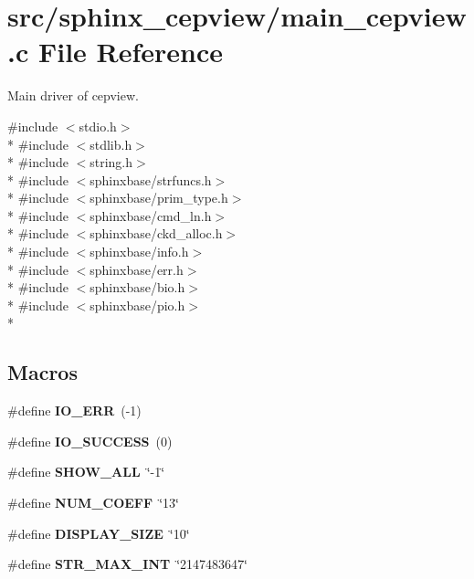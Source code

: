 \section{src/sphinx\-\_\-cepview/main\-\_\-cepview.c File Reference}
\label{main__cepview_8c}


Main driver of cepview.  


{\ttfamily \#include $<$stdio.\-h$>$}\\*
{\ttfamily \#include $<$stdlib.\-h$>$}\\*
{\ttfamily \#include $<$string.\-h$>$}\\*
{\ttfamily \#include $<$sphinxbase/strfuncs.\-h$>$}\\*
{\ttfamily \#include $<$sphinxbase/prim\-\_\-type.\-h$>$}\\*
{\ttfamily \#include $<$sphinxbase/cmd\-\_\-ln.\-h$>$}\\*
{\ttfamily \#include $<$sphinxbase/ckd\-\_\-alloc.\-h$>$}\\*
{\ttfamily \#include $<$sphinxbase/info.\-h$>$}\\*
{\ttfamily \#include $<$sphinxbase/err.\-h$>$}\\*
{\ttfamily \#include $<$sphinxbase/bio.\-h$>$}\\*
{\ttfamily \#include $<$sphinxbase/pio.\-h$>$}\\*
\subsection*{Macros}
\begin{DoxyCompactItemize}
\item 
\#define {\bfseries I\-O\-\_\-\-E\-R\-R}~(-\/1)\label{main__cepview_8c_a2f594e19531c324dd254ba0cc712044d}

\item 
\#define {\bfseries I\-O\-\_\-\-S\-U\-C\-C\-E\-S\-S}~(0)\label{main__cepview_8c_adad481c8f8fcb43725ccb11be5c690f4}

\item 
\#define {\bfseries S\-H\-O\-W\-\_\-\-A\-L\-L}~\char`\"{}-\/1\char`\"{}\label{main__cepview_8c_aaddcd19f0e123722b857ec68d1d3e156}

\item 
\#define {\bfseries N\-U\-M\-\_\-\-C\-O\-E\-F\-F}~\char`\"{}13\char`\"{}\label{main__cepview_8c_a56e7544225bcd9da32fa61cde6e6f523}

\item 
\#define {\bfseries D\-I\-S\-P\-L\-A\-Y\-\_\-\-S\-I\-Z\-E}~\char`\"{}10\char`\"{}\label{main__cepview_8c_a035c0b93babde37c8919064af8b67928}

\item 
\#define {\bfseries S\-T\-R\-\_\-\-M\-A\-X\-\_\-\-I\-N\-T}~\char`\"{}2147483647\char`\"{}\label{main__cepview_8c_a01f1f09f8562ef6971aa38c4f8f32954}

\end{DoxyCompactItemize}
